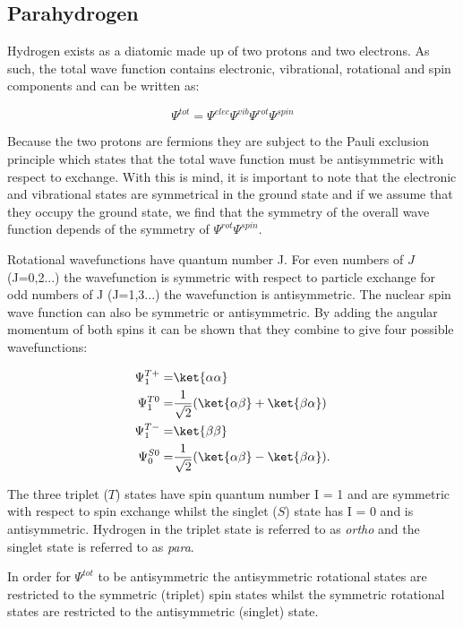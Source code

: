  \subsection{Parahydrogen}

 Hydrogen exists as a diatomic made up of two protons and two electrons. As such, the total
 wave function contains electronic, vibrational, rotational and spin components and can be
 written as:

 \begin{equation}
  \Psi^{tot} =\Psi^{elec}\Psi^{vib}\Psi^{rot}\Psi^{spin}
 \end{equation}

 Because the two protons are fermions they are subject to the Pauli exclusion principle
 which states that the total wave function must be antisymmetric with respect to exchange. With
 this is mind, it is important to note that the electronic and vibrational states are symmetrical
 in the ground state and if we assume that they occupy the ground state, we find that the symmetry
 of the overall wave function depends of the symmetry of $\Psi^{rot}$$\Psi^{spin}$.

 Rotational wavefunctions have quantum number J. For even numbers of $J$ (J=0,2...) the wavefunction
 is symmetric with respect to particle exchange for odd numbers of J (J=1,3...) the wavefunction is
 antisymmetric. The nuclear spin wave function can also be symmetric or antisymmetric. By adding the
 angular momentum of both spins it can be shown that they combine to give four possible wavefunctions:


 \begin{align}
 \Psi_{1}^{T+} =& \ket{\alpha\alpha}\\
 \Psi_{1}^{T0} =& \frac{1}{\sqrt{2}} (\ket{\alpha\beta}+\ket{\beta\alpha})\\
 \Psi_{1}^{T-} =& \ket{\beta\beta}\\
 \Psi_{0}^{S0} =& \frac{1}{\sqrt{2}} (\ket{\alpha\beta}-\ket{\beta\alpha}).
 \end{align}

 The three triplet ($T$) states have spin quantum number I = 1 and are symmetric with respect to spin exchange whilst
 the singlet ($S$) state has I = 0 and is antisymmetric. Hydrogen in the triplet state is referred to as \textit{ortho} and the
 singlet state is referred to as \textit{para}.

 In order for $\Psi^{tot}$ to be antisymmetric the antisymmetric rotational states are restricted to the symmetric
 (triplet) spin states whilst the symmetric rotational states are restricted to the antisymmetric (singlet) state.

